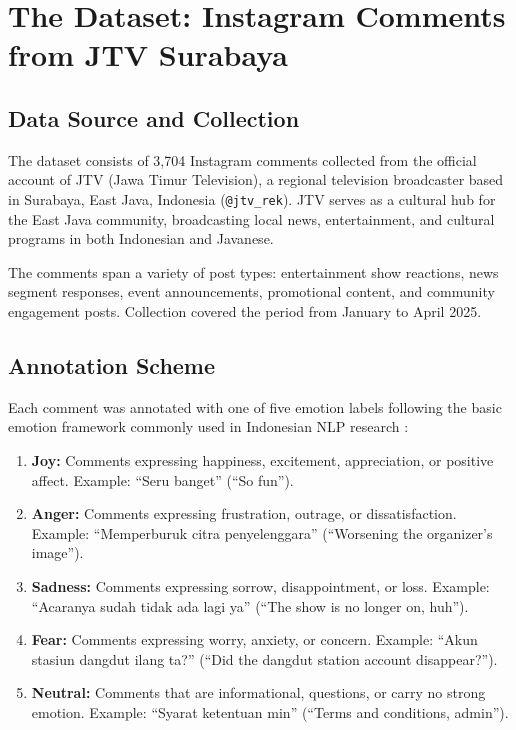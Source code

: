 \documentclass[12pt,a4paper,twoside]{article}
\theoremstyle{definition}
\begin{document}
\section{The Dataset: Instagram Comments from JTV Surabaya}
\label{sec:dataset}

\subsection{Data Source and Collection}

The dataset consists of 3{,}704 Instagram comments collected from the official account of JTV (Jawa Timur Television), a regional television broadcaster based in Surabaya, East Java, Indonesia (\texttt{@jtv\_rek}). JTV serves as a cultural hub for the East Java community, broadcasting local news, entertainment, and cultural programs in both Indonesian and Javanese.

The comments span a variety of post types: entertainment show reactions, news segment responses, event announcements, promotional content, and community engagement posts. Collection covered the period from January to April 2025.

\subsection{Annotation Scheme}

Each comment was annotated with one of five emotion labels following the basic emotion framework commonly used in Indonesian NLP research \citep{saputri2018emotion}:

\begin{enumerate}[leftmargin=2em]
    \item \textbf{Joy:} Comments expressing happiness, excitement, appreciation, or positive affect. Example: ``Seru banget'' (``So fun'').
    \item \textbf{Anger:} Comments expressing frustration, outrage, or dissatisfaction. Example: ``Memperburuk citra penyelenggara'' (``Worsening the organizer's image'').
    \item \textbf{Sadness:} Comments expressing sorrow, disappointment, or loss. Example: ``Acaranya sudah tidak ada lagi ya'' (``The show is no longer on, huh'').
    \item \textbf{Fear:} Comments expressing worry, anxiety, or concern. Example: ``Akun stasiun dangdut ilang ta?'' (``Did the dangdut station account disappear?'').
    \item \textbf{Neutral:} Comments that are informational, questions, or carry no strong emotion. Example: ``Syarat ketentuan min'' (``Terms and conditions, admin'').
\end{enumerate}
\end{document}
